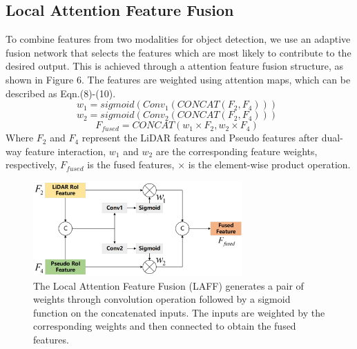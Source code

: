 \begin{sloppypar}
\subsection{Local Attention Feature Fusion}
To combine features from two modalities for object detection, we use an adaptive fusion network that selects the features which are most likely to contribute to the desired output. This is achieved through a attention feature fusion structure, as shown in Figure 6. The features are weighted using attention maps, which can be described as Eqn.(8)-(10).
\begin{equation}
w_1 = sigmoid(Conv_1(CONCAT(F_2,F_4))) \enspace
\end{equation}
\begin{equation}
w_2 = sigmoid(Conv_2(CONCAT(F_2,F_4))) \enspace
\end{equation}
\begin{equation}
F_{fused} = CONCAT(w_1\times F_2,w_2 \times F_4) \enspace
\end{equation}
Where $F_2$ and $F_4$ represent the LiDAR features and Pseudo features after dual-way feature interaction, $w_1$ and $w_2$ are the corresponding feature weights, respectively, $F_{fused}$ is the fused features, $\times$ is the element-wise product operation.

\begin{figure}[h]
\centering
\includegraphics[width=8cm]{new_images/fig12.png}
\caption{The Local Attention Feature Fusion (LAFF) generates a pair of weights through convolution operation followed by a sigmoid function on the concatenated inputs. The inputs are weighted by the corresponding weights and then connected to obtain the fused features.}
\label{fig_sim}
\end{figure}


\end{sloppypar}
